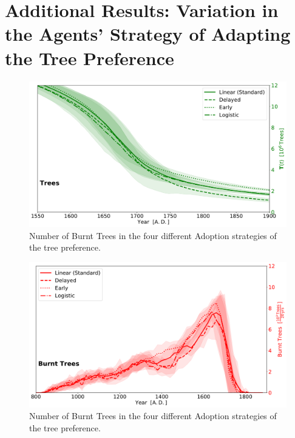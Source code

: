 \FloatBarrier
\section{Additional Results: Variation in the Agents' Strategy of Adapting the Tree Preference}
\begin{figure}[h]
	\centering
	\includegraphics[width=1\linewidth]{images/Results/TPref/TPrefAdaption_Trees}
	\caption{Number of Burnt Trees in the four different Adoption strategies of the tree preference.}
	\label{fig:tprefadaptiontrees}
\end{figure}

\begin{figure}[h]
	\centering
	\includegraphics[width=1.0\linewidth]{images/Results/TPref/TPrefAdaption_BurntTrees}
	\caption{Number of Burnt Trees in the four different Adoption strategies of the tree preference.}
	\label{fig:tprefadaptionburnttrees}
\end{figure}